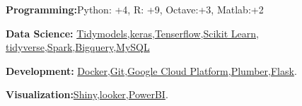



\textbf{Programming:}Python: +4, R: +9, Octave:+3, Matlab:+2


\textbf{Data Science:} \href{\https://www.tidymodels.org/}{Tidymodels},\href{https://keras.io/}{keras},\href{https://www.tensorflow.org/}{Tenserflow},\href{http://scikit-learn.org}{Scikit Learn}, \href{https://www.tidyverse.org/}{tidyverse},\href{http://spark.apache.org/}{Spark},\href{https://cloud.google.com/bigquery/?&utm_source=google&utm_medium=cpc&utm_campaign=latam-CO-all-es-dr-skws-all-all-trial-e-dr-1008075-LUAC0009164&utm_content=text-ad-none-none-DEV_c-CRE_431372551908-ADGP_SKWS+%7C+Multi+~+Big+Data+%7C+Big+Query-KWID_43700042625176868-kwd-372661971564-userloc_1003659&utm_term=KW_bigquery-ST_BigQuery&gclid=CjwKCAjwv4_1BRAhEiwAtMDLsoLVCuOjXJgg1dLlDJeFmM1zSswmEzh1U-QCR1dqziKckDttHE_B7BoC7lkQAvD_BwE&gclsrc=aw.ds}{Bigquery},\href{https://www.mysql.com/}{MySQL}

\textbf{Development:} \href{https://www.docker.com/}{Docker},\href{https://www.github.com}{Git},\href{https://cloud.google.com/}{Google Cloud Platform},\href{https://www.rplumber.io/}{Plumber},\href{https://flask.palletsprojects.com/en/1.1.x/}{Flask}.

\textbf{Visualization:}\href{https://shiny.rstudio.com/}{Shiny},\href{https://looker.com/}{looker},\href{https://powerbi.microsoft.com/es-es/}{PowerBI}.




